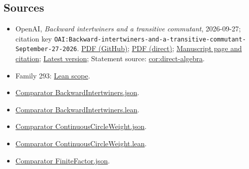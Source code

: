 \documentclass[11pt]{article}
\begin{document}
\subsection{Sources}
\begin{itemize}
\item OpenAI, \emph{Backward intertwiners and a transitive commutant}, 2026-09-27; citation key \texttt{OAI:Backward-intertwiners-and-a-transitive-commutant-September-27-2026}. \href{https://github.com/openai/math/blob/adc7f1241b42e322a6451854ab7e4b4c146bf78a/preprints/Backward-intertwiners-and-a-transitive-commutant-September-27-2026/paper.pdf}{PDF (GitHub)}; \href{https://github.com/openai/math/raw/adc7f1241b42e322a6451854ab7e4b4c146bf78a/preprints/Backward-intertwiners-and-a-transitive-commutant-September-27-2026/paper.pdf}{PDF (direct)}; \href{https://github.com/openai/math/blob/adc7f1241b42e322a6451854ab7e4b4c146bf78a/preprints/Backward-intertwiners-and-a-transitive-commutant-September-27-2026/README.md}{Manuscript page and citation}; \href{https://github.com/openai/math/blob/main/preprints/Backward-intertwiners-and-a-transitive-commutant-September-27-2026/paper.pdf}{Latest version}; Statement source: \href{https://github.com/openai/math/blob/adc7f1241b42e322a6451854ab7e4b4c146bf78a/preprints/Backward-intertwiners-and-a-transitive-commutant-September-27-2026/build/sections/introduction.tex\#L72}{cor:direct-algebra}.
\item Family 293: \href{https://github.com/openai/math/blob/adc7f1241b42e322a6451854ab7e4b4c146bf78a/lean/docs/293.md}{Lean scope}.
\item \href{https://github.com/openai/math/blob/adc7f1241b42e322a6451854ab7e4b4c146bf78a/lean/ComparatorChallenges/BackwardIntertwiners.json}{Comparator BackwardIntertwiners.json}.
\item \href{https://github.com/openai/math/blob/adc7f1241b42e322a6451854ab7e4b4c146bf78a/lean/ComparatorChallenges/BackwardIntertwiners.lean}{Comparator BackwardIntertwiners.lean}.
\item \href{https://github.com/openai/math/blob/adc7f1241b42e322a6451854ab7e4b4c146bf78a/lean/ComparatorChallenges/ContinuousCircleWeight.json}{Comparator ContinuousCircleWeight.json}.
\item \href{https://github.com/openai/math/blob/adc7f1241b42e322a6451854ab7e4b4c146bf78a/lean/ComparatorChallenges/ContinuousCircleWeight.lean}{Comparator ContinuousCircleWeight.lean}.
\item \href{https://github.com/openai/math/blob/adc7f1241b42e322a6451854ab7e4b4c146bf78a/lean/ComparatorChallenges/FiniteFactor.json}{Comparator FiniteFactor.json}.

\end{itemize}
\end{document}
